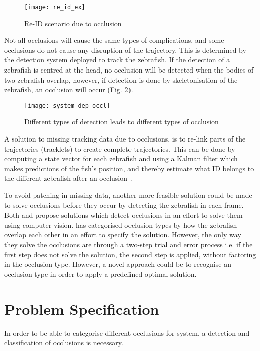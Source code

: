 \begin{figure}[H]
	\centering
	\texttt{[image: re\_id\_ex]}
	\caption{Re-ID scenario due to occlusion}
	\label{fig:re-id_Ex}
\end{figure}

Not all occlusions will cause the same types of complications, and some occlusions do not cause any disruption of the trajectory. This is determined by the detection system deployed to track the zebrafish. If the detection of a zebrafish is centred at the head, no occlusion will be detected when the bodies of two zebrafish overlap, however, if detection is done by skeletonisation of the zebrafish, an occlusion will occur (Fig. 2).\\

\begin{figure}[H]
	\centering
	\texttt{[image: system\_dep\_occl]}
	\caption{Different types of detection leads to different types of occlusion}
	\label{fig:system_dep_occl}
\end{figure}

A solution to missing tracking data due to occlusions, is to re-link parts of the trajectories (tracklets) to create complete trajectories. This can be done by computing a state vector for each zebrafish and using a Kalman filter which makes predictions of the fish’s position, and thereby estimate what ID belongs to the different zebrafish after an occlusion \citep{Feijo2018, Qian2014}.



To avoid patching in missing data, another more feasible solution could be made to solve occlusions before they occur by detecting the zebrafish in each frame. Both \cite{Romero-Ferrero2019} and \cite{Dolado2014} propose solutions which detect occlusions in an effort to solve them using computer vision. \cite{Dolado2014} has categorised occlusion types by how the zebrafish overlap each other in an effort to specify the solution. However, the only way they solve the occlusions are through a two-step trial and error process i.e. if the first step does not solve the solution, the second step is applied, without factoring in the occlusion type. 
However, a novel approach could be to recognise an occlusion type in order to apply a predefined optimal solution.

\section{Problem Specification}
In order to be able to categorise different occlusions for system, a detection and classification of occlusions is necessary.

